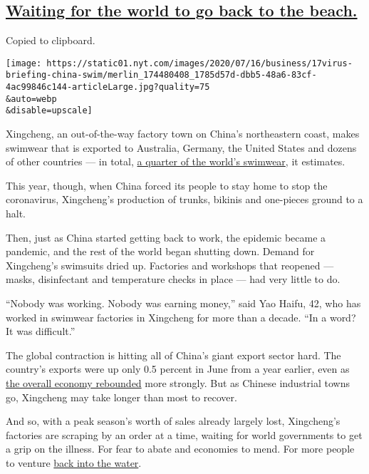 \hypertarget{waiting-for-the-world-to-go-back-to-the-beach}{%
\subsection{\texorpdfstring{\protect\hyperlink{waiting-for-the-world-to-go-back-to-the-beach}{Waiting
for the world to go back to the
beach.}}{Waiting for the world to go back to the beach.}}\label{waiting-for-the-world-to-go-back-to-the-beach}}

Copied to clipboard.

\texttt{[image: https://static01.nyt.com/images/2020/07/16/business/17virus-briefing-china-swim/merlin\_174480408\_1785d57d-dbb5-48a6-83cf-4ac99846c144-articleLarge.jpg?quality=75\\\&auto=webp\\\&disable=upscale]}

Xingcheng, an out-of-the-way factory town on China's northeastern coast,
makes swimwear that is exported to Australia, Germany, the United States
and dozens of other countries --- in total,
\href{https://www.chinadailyhk.com/articles/121/151/137/1557484560000.html?newsId=82464}{a
quarter of the world's swimwear}, it estimates.

This year, though, when China forced its people to stay home to stop the
coronavirus, Xingcheng's production of trunks, bikinis and one-pieces
ground to a halt.

Then, just as China started getting back to work, the epidemic became a
pandemic, and the rest of the world began shutting down. Demand for
Xingcheng's swimsuits dried up. Factories and workshops that reopened
--- masks, disinfectant and temperature checks in place --- had very
little to do.

``Nobody was working. Nobody was earning money,'' said Yao Haifu, 42,
who has worked in swimwear factories in Xingcheng for more than a
decade. ``In a word? It was difficult.''

The global contraction is hitting all of China's giant export sector
hard. The country's exports were up only 0.5 percent in June from a year
earlier, even as
\href{https://www.nytimes.com/2020/07/15/business/economy/china-coronavirus-economy.html}{the
overall economy rebounded} more strongly. But as Chinese industrial
towns go, Xingcheng may take longer than most to recover.

And so, with a peak season's worth of sales already largely lost,
Xingcheng's factories are scraping by an order at a time, waiting for
world governments to get a grip on the illness. For fear to abate and
economies to mend. For more people to venture
\href{https://www.nytimes.com/2020/05/27/world/europe/italy-beaches-coronavirus-reopening.html}{back
into the water}.

